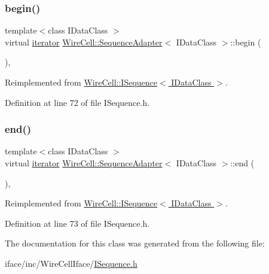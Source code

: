\subsubsection{\texorpdfstring{begin()}{begin()}}
{\footnotesize\ttfamily template$<$class I\+Data\+Class $>$ \\
virtual \hyperlink{class_wire_cell_1_1_sequence_adapter_aa277763ddf95ebdd40224c15863b2bbd}{iterator} \hyperlink{class_wire_cell_1_1_sequence_adapter}{Wire\+Cell\+::\+Sequence\+Adapter}$<$ I\+Data\+Class $>$\+::begin (\begin{DoxyParamCaption}{ }\end{DoxyParamCaption})\hspace{0.3cm}{\ttfamily [inline]}, {\ttfamily [virtual]}}



Reimplemented from \hyperlink{class_wire_cell_1_1_i_sequence_a03153c2cdc4d34c0feca9b214d4ed2a8}{Wire\+Cell\+::\+I\+Sequence$<$ I\+Data\+Class $>$}.



Definition at line 72 of file I\+Sequence.\+h.

\mbox{\label{class_wire_cell_1_1_sequence_adapter_a7b3736b3876b4a2091254e42cb5d2900}} 
\subsubsection{\texorpdfstring{end()}{end()}}
{\footnotesize\ttfamily template$<$class I\+Data\+Class $>$ \\
virtual \hyperlink{class_wire_cell_1_1_sequence_adapter_aa277763ddf95ebdd40224c15863b2bbd}{iterator} \hyperlink{class_wire_cell_1_1_sequence_adapter}{Wire\+Cell\+::\+Sequence\+Adapter}$<$ I\+Data\+Class $>$\+::end (\begin{DoxyParamCaption}{ }\end{DoxyParamCaption})\hspace{0.3cm}{\ttfamily [inline]}, {\ttfamily [virtual]}}



Reimplemented from \hyperlink{class_wire_cell_1_1_i_sequence_a4aeda2d0a7c1ffd3b1a708c7e983487a}{Wire\+Cell\+::\+I\+Sequence$<$ I\+Data\+Class $>$}.



Definition at line 73 of file I\+Sequence.\+h.



The documentation for this class was generated from the following file\+:\begin{DoxyCompactItemize}
\item 
iface/inc/\+Wire\+Cell\+Iface/\hyperlink{_i_sequence_8h}{I\+Sequence.\+h}\end{DoxyCompactItemize}
